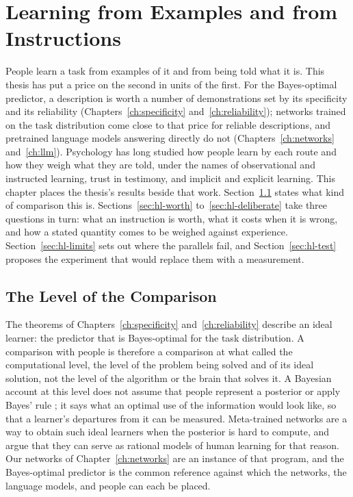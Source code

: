 \chapter{Learning from Examples and from Instructions}\label{ch:human}

People learn a task from examples of it and from being told what it is. This thesis has put a price on the second in units of the first. For the Bayes-optimal predictor, a description is worth a number of demonstrations set by its specificity and its reliability (Chapters~\ref{ch:specificity} and~\ref{ch:reliability}); networks trained on the task distribution come close to that price for reliable descriptions, and pretrained language models answering directly do not (Chapters~\ref{ch:networks} and~\ref{ch:llm}). Psychology has long studied how people learn by each route and how they weigh what they are told, under the names of observational and instructed learning, trust in testimony, and implicit and explicit learning. This chapter places the thesis's results beside that work. Section~\ref{sec:hl-scope} states what kind of comparison this is. Sections~\ref{sec:hl-worth} to~\ref{sec:hl-deliberate} take three questions in turn: what an instruction is worth, what it costs when it is wrong, and how a stated quantity comes to be weighed against experience. Section~\ref{sec:hl-limits} sets out where the parallels fail, and Section~\ref{sec:hl-test} proposes the experiment that would replace them with a measurement.

\section{The Level of the Comparison}\label{sec:hl-scope}
The theorems of Chapters~\ref{ch:specificity} and~\ref{ch:reliability} describe an ideal learner: the predictor that is Bayes-optimal for the task distribution. A comparison with people is therefore a comparison at what \citet{marr1982} called the computational level, the level of the problem being solved and of its ideal solution, not the level of the algorithm or the brain that solves it. A Bayesian account at this level does not assume that people represent a posterior or apply Bayes' rule \citep{griffiths2010}; it says what an optimal use of the information would look like, so that a learner's departures from it can be measured. Meta-trained networks are a way to obtain such ideal learners when the posterior is hard to compute, and \citet{binz2024meta} argue that they can serve as rational models of human learning for that reason. Our networks of Chapter~\ref{ch:networks} are an instance of that program, and the Bayes-optimal predictor is the common reference against which the networks, the language models, and people can each be placed.

